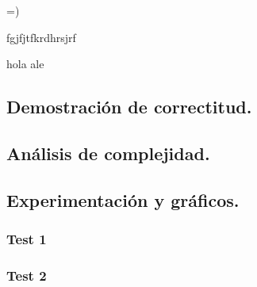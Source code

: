    
  
  
  =)
  
   fgjfjtfkrdhrsjrf
   
   hola ale

\vspace*{0.6cm}

\subsection{Demostración de correctitud.}

\vspace*{0.3cm}



\vspace*{0.6cm}

\subsection{Análisis de complejidad.}

\vspace*{0.3cm}


\vspace*{0.6cm}
\subsection{Experimentación y gráficos.}

\vspace*{0.3cm}

\subsubsection{Test 1}

\vspace*{0.3cm}

\vspace*{0.6cm}
\subsubsection{Test 2}

\vspace*{0.3cm}

